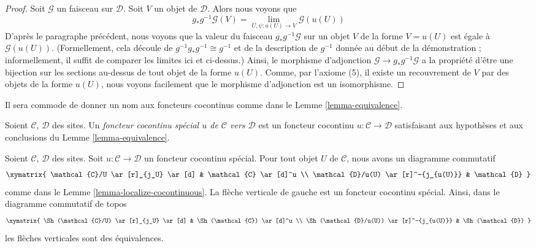 \begin{proof}
\medskip\noindent
Soit $\mathcal{G}$ un faisceau sur $\mathcal{D}$. Soit $V$ un
objet de $\mathcal{D}$. Alors nous voyons que
$$
g_*g^{-1}\mathcal{G}(V) =
\lim_{U, \psi : u(U) \to V} \mathcal{G}(u(U))
$$
D’après le paragraphe précédent, nous voyons que la valeur du faisceau
$g_*g^{-1}\mathcal{G}$ sur un objet $V$ de la forme $V = u(U)$
est égale à $\mathcal{G}(u(U))$. (Formellement, cela découle de
$g^{-1}g_*g^{-1} \cong g^{-1}$ et de la description
de $g^{-1}$ donnée au début de la démonstration ; informellement, il suffit de
comparer les limites ici et ci-dessus.)
Ainsi, le morphisme d’adjonction $\mathcal{G} \to g_*g^{-1}\mathcal{G}$
a la propriété d’être une bijection sur les sections au-dessus de tout objet de
la forme $u(U)$. Comme, par l’axiome (5), il
existe un recouvrement de $V$ par des objets de la forme $u(U)$, nous voyons
facilement que le morphisme d’adjonction est un isomorphisme.
\end{proof}

\noindent
Il sera commode de donner un nom aux foncteurs cocontinus comme dans le
Lemme \ref{lemma-equivalence}.

\begin{definition}
\label{definition-special-cocontinuous-functor}
Soient $\mathcal{C}$, $\mathcal{D}$ des sites.
Un {\it foncteur cocontinu spécial $u$ de $\mathcal{C}$ vers $\mathcal{D}$}
est un foncteur cocontinu $u : \mathcal{C} \to \mathcal{D}$ satisfaisant
aux hypothèses et aux conclusions du Lemme \ref{lemma-equivalence}.
\end{definition}

\begin{lemma}
\label{lemma-localize-special-cocontinuous}
Soient $\mathcal{C}$, $\mathcal{D}$ des sites.
Soit $u : \mathcal{C} \to \mathcal{D}$ un foncteur cocontinu spécial.
Pour tout objet $U$ de $\mathcal{C}$, nous avons un diagramme commutatif
$$
\xymatrix{
\mathcal{C}/U \ar[r]_{j_U} \ar[d] & \mathcal{C} \ar[d]^u \\
\mathcal{D}/u(U) \ar[r]^-{j_{u(U)}} & \mathcal{D}
}
$$
comme dans le Lemme \ref{lemma-localize-cocontinuous}.
La flèche verticale de gauche est un foncteur cocontinu spécial.
Ainsi, dans le diagramme commutatif de topos
$$
\xymatrix{
\Sh(\mathcal{C}/U) \ar[r]_{j_U} \ar[d] &
\Sh(\mathcal{C}) \ar[d]^u \\
\Sh(\mathcal{D}/u(U)) \ar[r]^-{j_{u(U)}} &
\Sh(\mathcal{D})
}
$$
les flèches verticales sont des équivalences.
\end{lemma}

